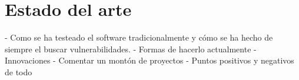 \chapter{Estado del arte}
\label{estado_del_arte}
- Como se ha testeado el software tradicionalmente y cómo se ha hecho de siempre el buscar vulnerabilidades.
- Formas de hacerlo actualmente
- Innovaciones
- Comentar un montón de proyectos
- Puntos positivos y negativos de todo
